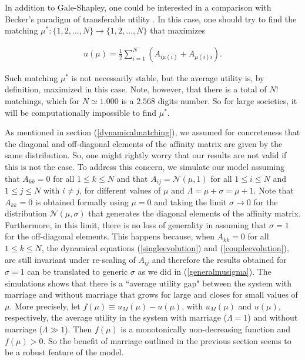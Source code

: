 \documentclass[12pt]{article}
\begin{document}
In addition to Gale-Shapley, one could be interested in a comparison with Becker's paradigm of transferable utility \cite{10.2307/1831130,10.2307/1829987}. In this case, one should try to find the matching $\mu^*:\{1,2,\dots,N\}\rightarrow\{1,2,\dots,N\}$ that maximizes

\begin{align}
    u(\mu)=\frac{1}{2}\sum_{i=1}^N(A_{i\mu(i)}+A_{\mu(i)i}).
\end{align}

\noindent Such matching $\mu^*$ is not necessarily stable, but the average utility is, by definition, maximized in this case. Note, however, that there is a total of $N!$ matchings, which for $N\simeq1.000$ is a $2.568$ digits number. So for large societies, it will be computationally impossible to find $\mu^*$.

As mentioned in section (\ref{dynamicalmatching}), we assumed for concreteness that the diagonal and off-diagonal elements of the affinity matrix are given by the same distribution. So, one might rightly worry that our results are not valid if this is not the case. To address this concern, we simulate our model assuming that $A_{kk}=0$ for all $1\leq k\leq N$ and that $A_{ij}=\mathcal{N}(\mu,1)$ for all $1\leq i\leq N$ and $1\leq j\leq N$ with $i\neq j$, for different values of $\mu$ and $\Lambda=\mu+\sigma=\mu+1$. Note that $A_{kk}=0$ is obtained formally using $\mu=0$ and taking the limit $\sigma\rightarrow0$ for the distribution $\mathcal{N}(\mu,\sigma)$ that generates the diagonal elements of the affinity matrix. Furthermore, in this limit, there is no loss of generality in assuming that $\sigma=1$ for the off-diagonal elements. This happens because, when $A_{kk}=0$ for all $1\leq k\leq N$, the dynamical equations (\ref{singleevolution}) and (\ref{coupleevolution}), are still invariant under re-scaling of $A_{ij}$ and therefore the results obtained for $\sigma=1$ can be translated to generic $\sigma$ as we did in (\ref{generalmusigma}). The simulations shows that there is a ``average utility gap" between the system with marriage and without marriage that grows for large and closes for small values of $\mu$. More precisely, let $f(\mu)\equiv u_{M}(\mu)-u(\mu)$, with $u_M(\mu)$ and $u(\mu)$, respectively, the average utility in the system with marriage ($\Lambda=1$) and without marriage ($\Lambda\gg1$). Then $f(\mu)$ is a monotonically non-decreasing function and $f(\mu)>0$. So the benefit of marriage outlined in the previous section seems to be a robust feature of the model.
\end{document}
